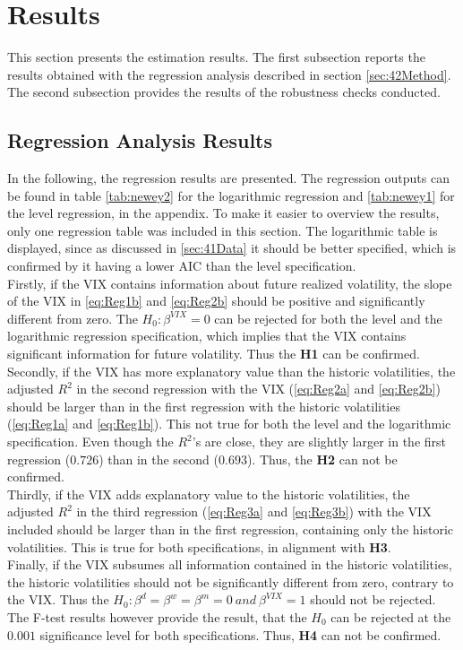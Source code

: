 
\section{Results}\label{sec:5Results}

This section presents the estimation results. The first subsection reports the results obtained with the regression analysis described in section \ref{sec:42Method}. The second subsection provides the results of the robustness checks conducted. 

\subsection{Regression Analysis Results}\label{sec:51Regression}
In the following, the regression results are presented. The regression outputs can be found in table \ref{tab:newey2} for the logarithmic regression and \ref{tab:newey1} for the level regression, in the appendix. To make it easier to overview the results, only one regression table was included in this section. The logarithmic table is displayed, since as discussed in \ref{sec:41Data} it should be better specified, which is confirmed by it having a lower AIC than the level specification.\\
Firstly, if the VIX contains information about future realized volatility, the slope of the VIX in \ref{eq:Reg1b} and \ref{eq:Reg2b} should be positive and significantly different from zero. The $H_{0}: \beta^{VIX} = 0$ can be rejected for both the level and the logarithmic regression specification, which implies that the VIX contains significant information for future volatility. Thus the \textbf{\ac{H1}} can be confirmed.\\
Secondly, if the VIX has more explanatory value than the historic volatilities, the adjusted $R^{2}$ in the second regression with the \ac{VIX} (\ref{eq:Reg2a} and \ref{eq:Reg2b}) should be larger than in the first regression with the historic volatilities (\ref{eq:Reg1a} and \ref{eq:Reg1b}). This not true for both the level and the logarithmic specification. Even though the $R^{2}$'s are close, they are slightly larger in the first regression ($0.726$) than in the second ($0.693$). Thus, the \textbf{\ac{H2}} can not be confirmed.\\
Thirdly, if the VIX adds explanatory value to the historic volatilities, the adjusted $R^{2}$ in the third regression (\ref{eq:Reg3a} and \ref{eq:Reg3b}) with the VIX included should be larger than in the first regression, containing only the historic volatilities. This is true for both specifications, in alignment with \textbf{\ac{H3}}.\\
Finally, if the VIX subsumes all information contained in the historic volatilities, the historic volatilities should not be significantly different from zero, contrary to the VIX. Thus the $H_{0}: \beta^{d} = \beta^{w} = \beta^{m} = 0 \ and \ \beta^{VIX} = 1$ should not be rejected. The F-test results however provide the result, that the $H_{0}$ can be rejected at the $0.001$ significance level for both specifications. Thus, \textbf{\ac{H4}} can not be confirmed.

